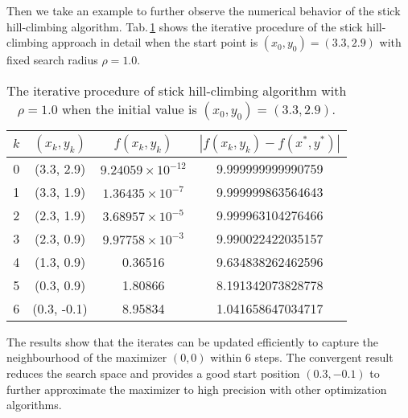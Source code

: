 \documentclass[mathpazo]{aamm}
\begin{document}
Then we take an example to further observe the numerical behavior
of the stick hill-climbing algorithm.
Tab.\,\ref{tab:gauss:CHC} shows the iterative procedure of the
stick hill-climbing approach in detail when the start point is
$(x_0, y_0)=(3.3, 2.9)$ with fixed search radius $\rho=1.0$. 
\begin{table}[!htbp]
\caption{\label{tab:gauss:CHC}The iterative procedure of stick
hill-climbing algorithm with $\rho=1.0$ when the initial value
is $(x_0, y_0)=(3.3, 2.9)$.}	
\begin{center}
	\footnotesize{
\begin{tabular}{|c|c|c|c|}
 \hline
 $k$ & $(x_k,y_k)$ & $f(x_k,y_k)$ & $|f(x_k,y_k)-f(x^*,y^*)|$
 \\ \hline
 0 & (3.3, 2.9) & $9.24059\times 10^{-12}$ & 9.999999999990759
 \\ \hline
 1 & (3.3, 1.9) & $1.36435\times 10^{-7}$ & 9.999999863564643  
 \\\hline
 2 & (2.3, 1.9) & $3.68957\times 10^{-5}$ & 9.999963104276466
 \\\hline
 3 & (2.3, 0.9) &  $9.97758\times 10^{-3}$ &  9.990022422035157
 \\\hline
 4 & (1.3, 0.9) & 0.36516 &  9.634838262462596
 \\\hline
 5 & (0.3, 0.9) & 1.80866    &  8.191342073828778
 \\\hline
 6 & (0.3, -0.1) & 8.95834   &  1.041658647034717
 \\\hline
\end{tabular}
}
\end{center}
\end{table}
The results show that the iterates can be updated efficiently to
capture the neighbourhood of the maximizer $(0,0)$ within $6$ steps. 
The convergent result reduces the search space and
provides a good start position $(0.3, -0.1)$ to further
approximate the maximizer to high precision with other
optimization algorithms.
\end{document}
